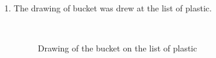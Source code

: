 \begin{enumerate}
\begin{enumerate}
		 \item The drawing of bucket was drew at the list of plastic.
		 		         \begin{figure}[H]
		 		         	\begin{minipage}[h]{0.2\linewidth}
		 		         		\center  
		 		         	\end{minipage}
		 		         	\begin{minipage}[h]{0.6\linewidth}
		 		         		\caption{Drawing of the bucket on the list of plastic}
		 		         	\end{minipage}

\end{figure}
\end{enumerate}
\end{enumerate}
